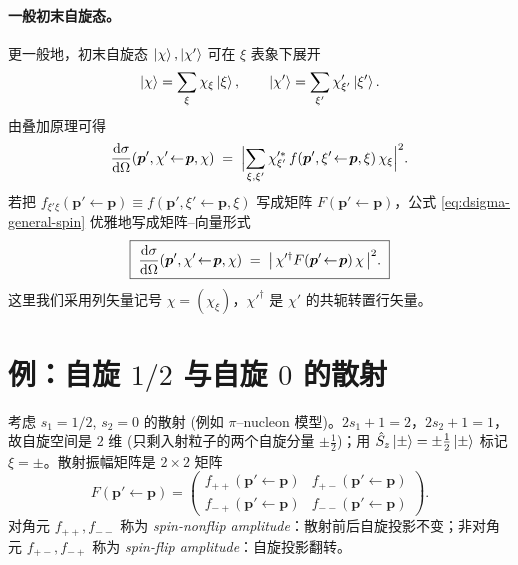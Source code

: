 \paragraph{一般初末自旋态。}更一般地，初末自旋态 $\ket\chi,\ket{\chi'}$ 可在 $\xi$ 表象下展开
\begin{equation}
  \ket\chi=\sum_\xi \chi_\xi\ket\xi,\qquad
  \ket{\chi'}=\sum_{\xi'}\chi'_{\xi'}\ket{\xi'}.
\end{equation}
由叠加原理可得
\begin{equation}
  \frac{\mathrm{d}\sigma}{\mathrm{d}\Omega}(\bm p',\chi'\!\leftarrow\!\bm p,\chi)
  \;=\;\Bigl|\sum_{\xi,\xi'}\chi'^{*}_{\xi'}\,f(\bm p',\xi'\!\leftarrow\!\bm p,\xi)\,\chi_\xi\Bigr|^2.
  \label{eq:dsigma-general-spin}
\end{equation}
若把 $f_{\xi'\xi}(\bm p'\!\leftarrow\!\bm p)\equiv f(\bm p',\xi'\!\leftarrow\!\bm p,\xi)$ 写成矩阵 $F(\bm p'\!\leftarrow\!\bm p)$，公式 \eqref{eq:dsigma-general-spin} 优雅地写成矩阵--向量形式
\begin{equation}
  \boxed{\;\frac{\mathrm{d}\sigma}{\mathrm{d}\Omega}(\bm p',\chi'\!\leftarrow\!\bm p,\chi)
  \;=\;\bigl|\,\chi'^{\dagger} F(\bm p'\!\leftarrow\!\bm p)\,\chi\,\bigr|^{2}.\;}
  \label{eq:dsigma-matrix-form}
\end{equation}
这里我们采用列矢量记号 $\chi=(\chi_\xi)$，$\chi'^\dagger$ 是 $\chi'$ 的共轭转置行矢量。

\section{例：自旋 $1/2$ 与自旋 $0$ 的散射}\label{sec:example-12-0}

考虑 $s_1=1/2$, $s_2=0$ 的散射 (例如 $\pi$--nucleon 模型)。$2s_1+1=2$，$2s_2+1=1$，故自旋空间是 $2$ 维 (只剩入射粒子的两个自旋分量 $\pm\tfrac12$)；用 $\hat{S}_z\ket{\pm}=\pm\tfrac12\ket{\pm}$ 标记 $\xi=\pm$。散射振幅矩阵是 $2\times 2$ 矩阵
\begin{equation}
  F(\bm p'\!\leftarrow\!\bm p)
  =\begin{pmatrix}
   f_{++}(\bm p'\!\leftarrow\!\bm p) & f_{+-}(\bm p'\!\leftarrow\!\bm p)\\[2pt]
   f_{-+}(\bm p'\!\leftarrow\!\bm p) & f_{--}(\bm p'\!\leftarrow\!\bm p)
  \end{pmatrix}.
  \label{eq:F-12-0}
\end{equation}
对角元 $f_{++},f_{--}$ 称为 \emph{spin-nonflip amplitude}：散射前后自旋投影不变；非对角元 $f_{+-},f_{-+}$ 称为 \emph{spin-flip amplitude}：自旋投影翻转。

